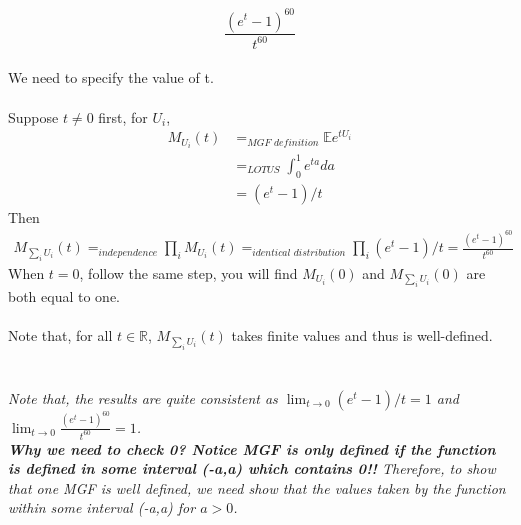 
\setcounter{theorem}{13}
\begin{exercise} [BH.6.14] 
\begin{solution}
  \[\frac{\left(e^t -1 \right)^{60}}{t^{60}} \]~\\
	We need to specify the value of t. \\~\\
	Suppose $t\neq 0$ first,
	for $U_i$,
	\begin{align*}
		M_{U_i}(t) &=_{\textit{MGF definition}}  \mathbb{E}e^{tU_i} \\
		&=_{\textit{LOTUS}} \int_{0}^{1} e^{ta} da \\
		&= (e^t-1)/t  
	\end{align*}
	Then 
	\begin{align*}
		M_{\sum_i U_i}(t) =_{\textit{independence}} \prod_i M_{ U_i}(t) =_{\textit{identical distribution}}  \prod_i (e^t-1)/t = \frac{\left(e^t -1 \right)^{60}}{t^{60}} 
	\end{align*}
	When $t=0$, follow the same step, you will find $M_{U_i}(0)$ and $M_{\sum_i U_i}(0)$ are both equal to one. \\~\\
	Note that, for all $t\in \mathbb{R}$, $M_{\sum_i U_i}(t)$ takes finite values and thus is well-defined. 
	\\~\\~\\
	
	\textit{Note that, the results are quite consistent as $\lim_{t\rightarrow 0} (e^t-1)/t =1  $  and $\lim_{t\rightarrow 0} \frac{\left(e^t -1 \right)^{60}}{t^{60}}  =1  $.\\ \textbf{Why we need to check 0? Notice MGF is only defined if the function is defined in some interval (-a,a) which contains 0!!} Therefore, to show that one MGF is well defined, we need show that the values taken by the function within some interval (-a,a) for $a >0$.}
\end{solution}


\end{exercise}

